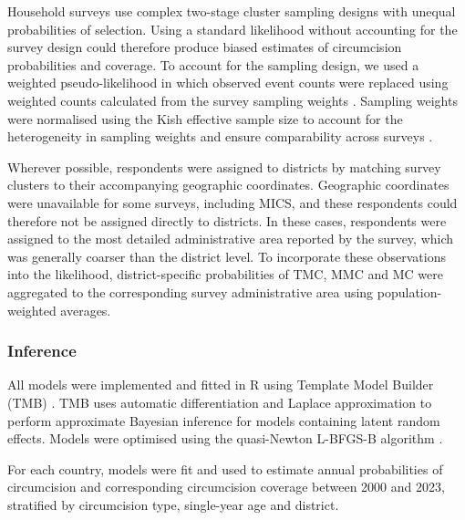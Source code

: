 \documentclass{article}
\begin{document}
Household surveys use complex two-stage cluster sampling designs with unequal probabilities of selection. Using a standard likelihood without accounting for the survey design could therefore produce biased estimates of circumcision probabilities and coverage. To account for the sampling design, we used a weighted pseudo-likelihood in which observed event counts were replaced using weighted counts calculated from the survey sampling weights \cite{thomas2024substantial}. Sampling weights were normalised using the Kish effective sample size to account for the heterogeneity in sampling weights and ensure comparability across surveys \cite{kish1965survey}.

Wherever possible, respondents were assigned to districts by matching survey clusters to their accompanying geographic coordinates. Geographic coordinates were unavailable for some surveys, including MICS, and these respondents could therefore not be assigned directly to districts. In these cases, respondents were assigned to the most detailed administrative area reported by the survey, which was generally coarser than the district level. To incorporate these observations into the likelihood, district-specific probabilities of TMC, MMC and MC were aggregated to the corresponding survey administrative area using population-weighted averages.


\subsubsection*{Inference}


All models were implemented and fitted in R \cite{rcore} using Template Model Builder (TMB) \cite{kristensen2016tmb}. TMB uses automatic differentiation and Laplace approximation to perform approximate Bayesian inference for models containing latent random effects. Models were optimised using the quasi-Newton L-BFGS-B algorithm \cite{byrd1995limited}.

For each country, models were fit and used to estimate annual probabilities of circumcision and corresponding circumcision coverage between 2000 and 2023, stratified by circumcision type, single-year age and district. 
\end{document}
